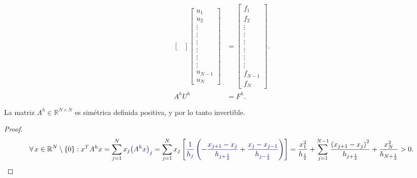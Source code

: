 \begin{frame}
\begin{align*}
\begin{bmatrix}
		\end{bmatrix}
		\begin{bmatrix}
			u_{1}   \\
			u_{2}   \\
			\vdots  \\
			\vdots  \\
			\vdots  \\
			\vdots  \\
			\vdots  \\
			\vdots  \\
			u_{N-1} \\
			u_{N}
		\end{bmatrix} & =
		\begin{bmatrix}
			f_{1}   \\
			f_{2}   \\
			\vdots  \\
			\vdots  \\
			\vdots  \\
			\vdots  \\
			\vdots  \\
			\vdots  \\
			f_{N-1} \\
			f_{N}
		\end{bmatrix}.      \\
		A^{h}U^{h}      & =
		F^{h}.
	\end{align*}

	\pause

	\begin{theorem}[El sistema $A^{h}U^{h}=F^{h}$ tiene solución~\cite{Thomas1999}]
		La matriz $A^{h}\in\mathbb{R}^{N\times N}$ es simétrica definida
		positiva, y por lo tanto invertible.
	\end{theorem}

	\pause

	\begin{proof}
		\begin{equation*}
			\forall x\in\mathbb{R}^{N}\setminus\left\{0\right\}:
			x^{T}A^{h}x=
			\sum_{j=1}^{N}
			x_{j}
			\mathcolor{DarkBlue}{
				{\big(A^{h}x\big)}_{j}
			}=
			\sum_{j=1}^{N}
			x_{j}
			\mathcolor{DarkBlue}{
				\left[
					\frac{1}{h_{j}}
					\left(
					-\frac{x_{j+1}-x_{j}}{h_{j+\frac{1}{2}}}+
					\frac{x_{j}-x_{j-1}}{h_{j-\frac{1}{2}}}
					\right)
					\right]
			}=
			\frac{x^{2}_{1}}{h_{\frac{1}{2}}}+
			\sum_{j=1}^{N-1}
			\frac{{\left(x_{j+1}-x_{j}\right)}^{2}}{h_{j+\frac{1}{2}}}+
			\frac{x^{2}_{N}}{h_{N+\frac{1}{2}}}
			>0.
		\end{equation*}
	\end{proof}
\end{frame}

